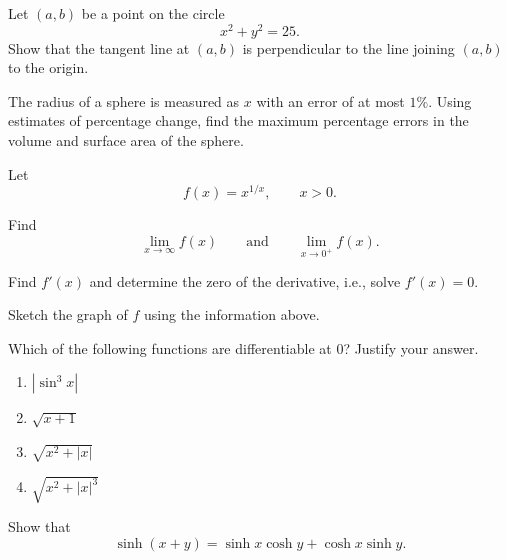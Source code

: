 \begin{problem}
\begin{problemsubparts}
\item Let $(a,b)$ be a point on the circle
\[
x^2+y^2=25.
\]
Show that the tangent line at $(a,b)$ is perpendicular to the line joining $(a,b)$ to the origin.
\item The radius of a sphere is measured as $x$ with an error of at most $1\%$. Using estimates of percentage change, find the maximum percentage errors in the volume and surface area of the sphere.
\end{problemsubparts}
\end{problem}

\begin{problem}
Let
\[
f(x)=x^{1/x},
\qquad x>0.
\]
\begin{problemsubparts}
\item Find
\[
\lim_{x\to\infty}f(x)
\qquad\text{and}\qquad
\lim_{x\to0^+}f(x).
\]
\item Find $f'(x)$ and determine the zero of the derivative, i.e., solve $f'(x)=0$.
\item Sketch the graph of $f$ using the information above.
\end{problemsubparts}
\end{problem}

\begin{problem}
\begin{problemsubparts}
\item Which of the following functions are differentiable at $0$? Justify your answer.
\begin{enumerate}[label=\textup{(\roman*)},leftmargin=2.55em,labelsep=0.62em,itemsep=0.18em,topsep=0.42em,parsep=0pt,partopsep=0pt]
\item $|\sin^3 x|$
\item $\sqrt{x+1}$
\item $\sqrt{x^2+|x|}$
\item $\sqrt{x^2+|x|^3}$
\end{enumerate}
\item Show that
\[
\sinh(x+y)=\sinh x\cosh y+\cosh x\sinh y.
\]
\end{problemsubparts}
\end{problem}

